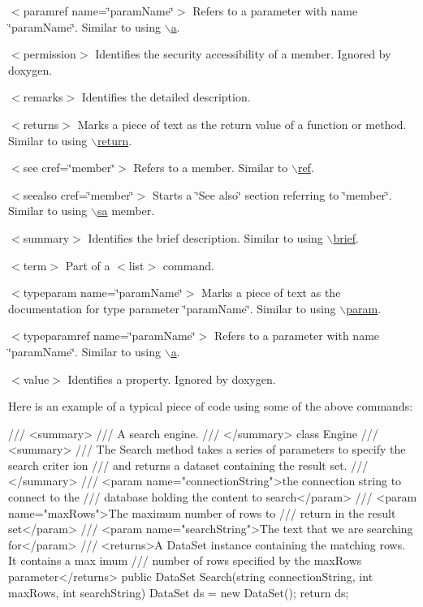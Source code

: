 \begin{DoxyItemize}
\item {\ttfamily $<$paramref name=\char`\"{}paramName\char`\"{}$>$} Refers to a parameter with name \char`\"{}paramName\char`\"{}. Similar to using \hyperlink{commands_cmda}{$\backslash$a}. 
\item {\ttfamily $<$permission$>$} Identifies the security accessibility of a member. Ignored by doxygen. 
\item {\ttfamily $<$remarks$>$} Identifies the detailed description. 
\item {\ttfamily $<$returns$>$} Marks a piece of text as the return value of a function or method. Similar to using \hyperlink{commands_cmdreturn}{$\backslash$return}. 
\item {\ttfamily $<$see cref=\char`\"{}member\char`\"{}$>$} Refers to a member. Similar to \hyperlink{commands_cmdref}{$\backslash$ref}. 
\item {\ttfamily $<$seealso cref=\char`\"{}member\char`\"{}$>$} Starts a \char`\"{}See also\char`\"{} section referring to \char`\"{}member\char`\"{}. Similar to using \hyperlink{commands_cmdsa}{$\backslash$sa} member. 
\item {\ttfamily $<$summary$>$} Identifies the brief description. Similar to using \hyperlink{commands_cmdbrief}{$\backslash$brief}. 
\item {\ttfamily $<$term$>$} Part of a {\ttfamily $<$list$>$} command. 
\item {\ttfamily $<$typeparam name=\char`\"{}paramName\char`\"{}$>$} Marks a piece of text as the documentation for type parameter \char`\"{}paramName\char`\"{}. Similar to using \hyperlink{commands_cmdparam}{$\backslash$param}. 
\item {\ttfamily $<$typeparamref name=\char`\"{}paramName\char`\"{}$>$} Refers to a parameter with name \char`\"{}paramName\char`\"{}. Similar to using \hyperlink{commands_cmda}{$\backslash$a}. 
\item {\ttfamily $<$value$>$} Identifies a property. Ignored by doxygen. 
\end{DoxyItemize}

Here is an example of a typical piece of code using some of the above commands:


\begin{DoxyCode}
/// <summary>
/// A search engine.
/// </summary>
class Engine
{
  /// <summary>
  /// The Search method takes a series of parameters to specify the search criter
      ion
  /// and returns a dataset containing the result set.
  /// </summary>
  /// <param name="connectionString">the connection string to connect to the
  /// database holding the content to search</param>
  /// <param name="maxRows">The maximum number of rows to
  /// return in the result set</param>
  /// <param name="searchString">The text that we are searching for</param>
  /// <returns>A DataSet instance containing the matching rows. It contains a max
      imum
  /// number of rows specified by the maxRows parameter</returns>
  public DataSet Search(string connectionString, int maxRows, int searchString)
  {
    DataSet ds = new DataSet();
    return ds;
  }
}
\end{DoxyCode}
 